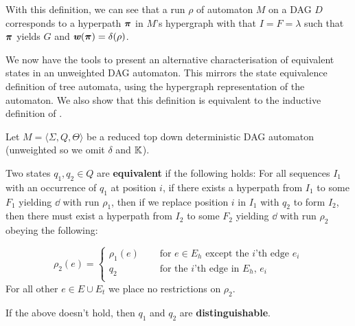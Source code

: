 \documentclass[11pt]{article}
\begin{document}
With this definition, we can see that a run $\rho$ of automaton $M$ on a DAG $D$
corresponds to a hyperpath $\boldsymbol{\pi}$ in $M$'s hypergraph with that $I = F =
\lambda$ such that $\boldsymbol{\pi}$ yields $G$ and $\boldsymbol{\mathit{w}}(\boldsymbol{\pi}) = \delta(\rho)$. 

We now have the tools to present an alternative characterisation of equivalent
states in an unweighted DAG automaton. This mirrors the state equivalence
definition of tree automata, using the hypergraph representation of the
automaton. We also show that this definition is equivalent to the inductive
definition of \cite{blum2019properties}.

\begin{definition}\label{def:unweightedequivalence}
  
  Let $M =  \langle \Sigma, Q, \Theta\rangle$ be a reduced top down
  deterministic DAG automaton (unweighted so we omit $\delta$ and $\mathbb{K}$).
  
  Two states $q_1, q_2 \in Q$ are \textbf{equivalent} if the following holds:
  For all sequences $I_1$ with an occurrence of $q_1$ at position $i$, if there
  exists a hyperpath from $I_1$ to some $F_1$ yielding $\dd$ with run $\rho_1$,
  then if we replace position $i$ in $I_1$ with $q_2$ to form $I_2$, then there
  must exist a hyperpath from $I_2$ to some $F_2$ yielding $\dd$ with run
  $\rho_2$ obeying the following:
  
  \[
    \rho_2(e) = \begin{cases}
      \rho_1(e) &\quad \text{ for } e \in E_h \text{ except the $i$'th edge } e_i\\
      q_2 &\quad \text{ for the $i$'th edge in $E_h$, } e_i\\
    \end{cases}
  \]
  For all other $e \in E \cup E_t$ we place no restrictions on $\rho_2$. 

  If the above doesn't hold, then $q_1$ and $q_2$ are \textbf{distinguishable}.

\end{definition}
\end{document}
